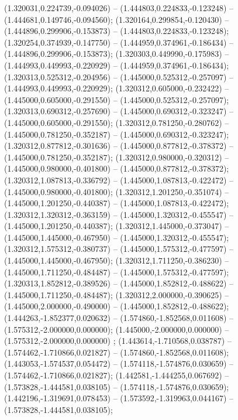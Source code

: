  (1.320031,0.224739,-0.094026) -- (1.444803,0.224833,-0.123248) -- (1.444681,0.149746,-0.094560);
 (1.320164,0.299854,-0.120430) -- (1.444896,0.299906,-0.153873) -- (1.444803,0.224833,-0.123248);
 (1.320254,0.374939,-0.147750) -- (1.444959,0.374961,-0.186434) -- (1.444896,0.299906,-0.153873);
 (1.320303,0.449990,-0.175983) -- (1.444993,0.449993,-0.220929) -- (1.444959,0.374961,-0.186434);
 (1.320313,0.525312,-0.204956) -- (1.445000,0.525312,-0.257097) -- (1.444993,0.449993,-0.220929);
 (1.320312,0.605000,-0.232422) -- (1.445000,0.605000,-0.291550) -- (1.445000,0.525312,-0.257097);
 (1.320313,0.690312,-0.257690) -- (1.445000,0.690312,-0.323247) -- (1.445000,0.605000,-0.291550);
 (1.320312,0.781250,-0.280762) -- (1.445000,0.781250,-0.352187) -- (1.445000,0.690312,-0.323247);
 (1.320312,0.877812,-0.301636) -- (1.445000,0.877812,-0.378372) -- (1.445000,0.781250,-0.352187);
 (1.320312,0.980000,-0.320312) -- (1.445000,0.980000,-0.401800) -- (1.445000,0.877812,-0.378372);
 (1.320312,1.087813,-0.336792) -- (1.445000,1.087813,-0.422472) -- (1.445000,0.980000,-0.401800);
 (1.320312,1.201250,-0.351074) -- (1.445000,1.201250,-0.440387) -- (1.445000,1.087813,-0.422472);
 (1.320312,1.320312,-0.363159) -- (1.445000,1.320312,-0.455547) -- (1.445000,1.201250,-0.440387);
 (1.320312,1.445000,-0.373047) -- (1.445000,1.445000,-0.467950) -- (1.445000,1.320312,-0.455547);
 (1.320312,1.575312,-0.380737) -- (1.445000,1.575312,-0.477597) -- (1.445000,1.445000,-0.467950);
 (1.320312,1.711250,-0.386230) -- (1.445000,1.711250,-0.484487) -- (1.445000,1.575312,-0.477597);
 (1.320313,1.852812,-0.389526) -- (1.445000,1.852812,-0.488622) -- (1.445000,1.711250,-0.484487);
 (1.320312,2.000000,-0.390625) -- (1.445000,2.000000,-0.490000) -- (1.445000,1.852812,-0.488622);
 (1.444263,-1.852377,0.020632) -- (1.574860,-1.852568,0.011608) -- (1.575312,-2.000000,0.000000);
 (1.445000,-2.000000,0.000000) -- (1.575312,-2.000000,0.000000) ;
 (1.443614,-1.710568,0.038787) -- (1.574462,-1.710866,0.021827) -- (1.574860,-1.852568,0.011608);
 (1.443053,-1.574537,0.054472) -- (1.574118,-1.574876,0.030659) -- (1.574462,-1.710866,0.021827);
 (1.442581,-1.444255,0.067692) -- (1.573828,-1.444581,0.038105) -- (1.574118,-1.574876,0.030659);
 (1.442196,-1.319691,0.078453) -- (1.573592,-1.319963,0.044167) -- (1.573828,-1.444581,0.038105);
